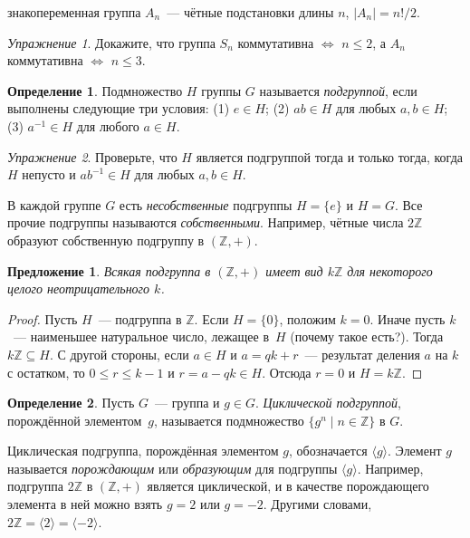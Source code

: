 \documentclass[a4paper,10pt]{amsart}
\def\ZZ{{\mathbb Z}}%
\newtheorem{proposition}{Предложение}
\theoremstyle{definition}
\newtheorem{definition}{Определение}
\theoremstyle{remark}
\newtheorem{exc}{Упражнение}
\begin{document}
знакопеременная группа $A_n$~--- чётные подстановки длины $n$,
$|A_n|=n!/2$.

\begin{exc}
Докажите, что группа $S_n$ коммутативна $\Leftrightarrow$ $n
\leqslant 2$, а $A_n$ коммутативна $\Leftrightarrow$ $n \leqslant
3$.
\end{exc}

\begin{definition}
Подмножество $H$ группы $G$ называется {\it подгруппой}, если выполнены следующие три условия: (1) $e \in H$; \quad (2) $ab\in H$ для любых $a,b
\in H$; \quad (3) $a^{-1}\in H$ для любого
$a\in H$.
\end{definition}

\begin{exc}
Проверьте, что $H$ является подгруппой тогда и только тогда, когда
 $H$ непусто и $ab^{-1}\in H$ для любых $a,b\in H$.
\end{exc}

В каждой группе $G$ есть {\it несобственные} подгруппы $H=\{e\}$ и
$H=G$. Все прочие подгруппы называются {\it собственными}. Например,
чётные числа $2\ZZ$ образуют собственную подгруппу в $(\ZZ,+)$.

\begin{proposition} \label{sbgrz}
Всякая подгруппа в $(\ZZ,+)$ имеет вид $k\ZZ$ для некоторого целого
неотрицательного $k$.
\end{proposition}

\begin{proof}
Пусть $H$~--- подгруппа в $\ZZ$. Если $H=\{0\}$, положим $k=0$.
Иначе пусть $k$~--- наименьшее натуральное число, лежащее в~$H$
(почему такое есть?). Тогда $k\ZZ \subseteq H$. С другой стороны,
если $a\in H$ и $a=qk+r$~--- результат деления $a$ на $k$ с
остатком, то $0 \leqslant r \leqslant k-1$ и $r = a - qk \in H$.
Отсюда $r=0$ и $H=k\ZZ$.
\end{proof}

\begin{definition}
Пусть $G$~--- группа и $g\in G$. {\it Циклической подгруппой},
порождённой элементом~$g$, называется подмножество $\{g^n \mid
n\in\ZZ\}$ в $G$.
\end{definition}

Циклическая подгруппа, порождённая элементом $g$, обозначается
$\langle g\rangle$. Элемент $g$ называется {\it порождающим} или
{\it образующим} для подгруппы $\langle g\rangle$. Например,
подгруппа $2\ZZ$ в $(\ZZ,+)$ является циклической, и в качестве
порождающего элемента в ней можно взять $g=2$ или $g=-2$. Другими
словами, $2\ZZ=\langle 2\rangle=\langle -2\rangle$.
\end{document}
